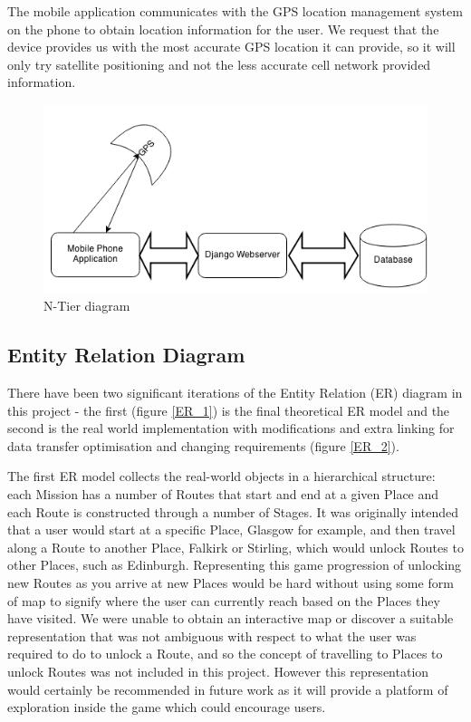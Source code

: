 The mobile application communicates with the GPS location
management system on the phone to obtain location information for the
user. We request that the device provides us with the most
accurate GPS location it can provide, so it will only try satellite
positioning and not the less accurate cell network provided information.
\begin{figure}[H]
  \centering
  \includegraphics[width=\textwidth]{images/N-tier.png}
  \caption{N-Tier diagram}
  \label{NTier}
\end{figure}

\subsection{Entity Relation Diagram}
\label{sec:ER}
There have been two significant iterations of the Entity Relation (ER)
diagram in this project - the first (figure \ref{ER_1}) is the final
theoretical ER model and the second is the real world implementation
with modifications and extra linking for data transfer optimisation
and changing requirements (figure \ref{ER_2}).

The first ER model collects the real-world objects in a hierarchical
structure: each Mission has a number of Routes that start and end at a
given Place and each Route is constructed through a number of
Stages. It was originally intended that a user would start at a
specific Place, Glasgow for example, and then travel along a Route to
another Place, Falkirk or Stirling, which would unlock Routes to other
Places, such as Edinburgh. Representing this game progression of
unlocking new Routes as you arrive at new Places would be hard without
using some form of map to signify where the user can currently reach
based on the Places they have visited. We were unable to obtain an
interactive map or discover a suitable representation that was not
ambiguous with respect to what the user was required to do to unlock a
Route, and so the concept of travelling to Places to unlock Routes was
not included in this project. However this representation would
certainly be recommended in future work as it will provide a platform
of exploration inside the game which could encourage users.

